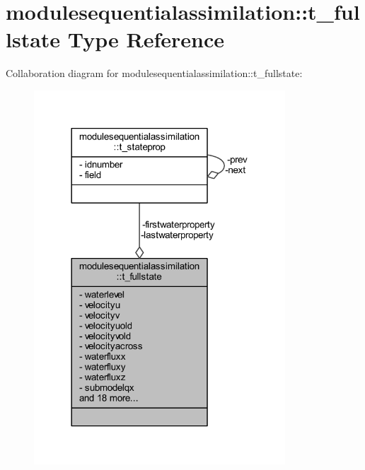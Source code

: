 \hypertarget{structmodulesequentialassimilation_1_1t__fullstate}{}\section{modulesequentialassimilation\+:\+:t\+\_\+fullstate Type Reference}
\label{structmodulesequentialassimilation_1_1t__fullstate}


Collaboration diagram for modulesequentialassimilation\+:\+:t\+\_\+fullstate\+:\nopagebreak
\begin{figure}[H]
\begin{center}
\leavevmode
\includegraphics[width=266pt]{structmodulesequentialassimilation_1_1t__fullstate__coll__graph}
\end{center}
\end{figure}
